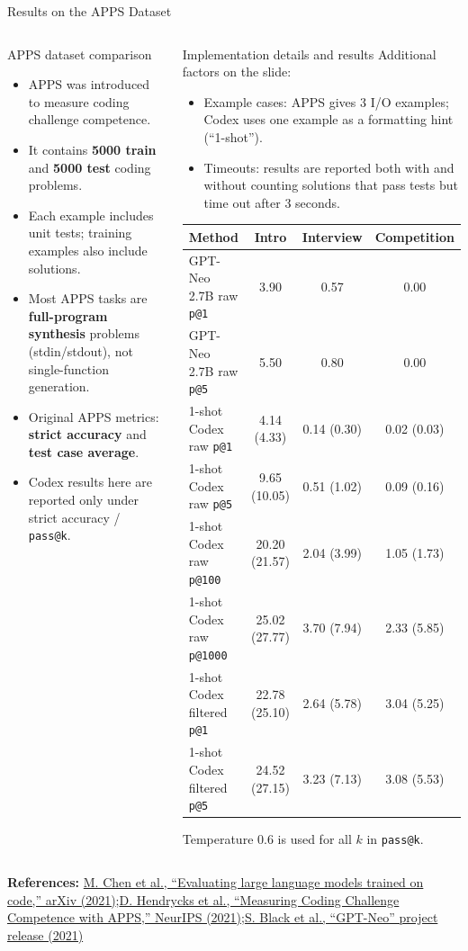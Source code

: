 \documentclass[aspectratio=43,9pt]{beamer}
\newcommand{\srclink}[2]{\href{#2}{\textcolor{black!68}{#1}}}
\newcommand{\sep}{;\hspace{0.35em}}
\newcommand{\refline}[2][References]{%
  \vfill
  {\raggedright\fontsize{5.1}{5.5}\selectfont\color{black!68}\textbf{#1:} #2\par}%
}
\newcommand{\srcChen}{\srclink{M. Chen et al., ``Evaluating large language models trained on code,'' arXiv (2021)}{https://arxiv.org/abs/2107.03374}}
\newcommand{\srcHendrycks}{\srclink{D. Hendrycks et al., ``Measuring Coding Challenge Competence with APPS,'' NeurIPS (2021)}{https://arxiv.org/abs/2105.09938}}
\newcommand{\srcBlack}{\srclink{S. Black et al., ``GPT-Neo'' project release (2021)}{https://zenodo.org/records/5297715}}
\begin{document}
\begin{frame}{Results on the APPS Dataset}
\tiny
\begin{columns}[T,totalwidth=\textwidth]
\begin{block}{APPS dataset comparison}
\begin{itemize}
  \item APPS was introduced to measure coding challenge competence.
  \item It contains \textbf{5000 train} and \textbf{5000 test} coding problems.
  \item Each example includes unit tests; training examples also include solutions.
  \item Most APPS tasks are \textbf{full-program synthesis} problems (stdin/stdout), not single-function generation.
  \item Original APPS metrics: \textbf{strict accuracy} and \textbf{test case average}.
  \item Codex results here are reported only under strict accuracy / \texttt{pass@k}.
\end{itemize}
\end{block}

\begin{block}{Implementation details and results}
Additional factors on the slide:
\begin{itemize}
  \item Example cases: APPS gives 3 I/O examples; Codex uses one example as a formatting hint (``1-shot'').
  \item Timeouts: results are reported both with and without counting solutions that pass tests but time out after 3 seconds.
\end{itemize}

\begin{tabular}{lccc}
\toprule
Method & Intro & Interview & Competition\\
\midrule
GPT-Neo 2.7B raw \texttt{p@1} & 3.90 & 0.57 & 0.00\\
GPT-Neo 2.7B raw \texttt{p@5} & 5.50 & 0.80 & 0.00\\
1-shot Codex raw \texttt{p@1} & 4.14 (4.33) & 0.14 (0.30) & 0.02 (0.03)\\
1-shot Codex raw \texttt{p@5} & 9.65 (10.05) & 0.51 (1.02) & 0.09 (0.16)\\
1-shot Codex raw \texttt{p@100} & 20.20 (21.57) & 2.04 (3.99) & 1.05 (1.73)\\
1-shot Codex raw \texttt{p@1000} & 25.02 (27.77) & 3.70 (7.94) & 2.33 (5.85)\\
1-shot Codex filtered \texttt{p@1} & 22.78 (25.10) & 2.64 (5.78) & 3.04 (5.25)\\
1-shot Codex filtered \texttt{p@5} & 24.52 (27.15) & 3.23 (7.13) & 3.08 (5.53)\\
\bottomrule
\end{tabular}

Temperature 0.6 is used for all \(k\) in \texttt{pass@k}.
\end{block}
\end{columns}

\refline{\srcChen\sep \srcHendrycks\sep \srcBlack}
\end{frame}
\end{document}
